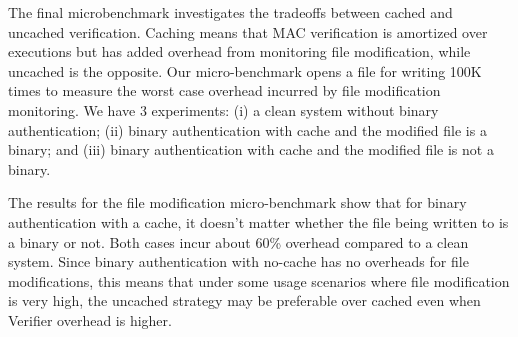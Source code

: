 The final microbenchmark investigates the tradeoffs between cached
and uncached verification.
Caching means that MAC verification is amortized over executions
but has added overhead from monitoring file modification,
while uncached is the opposite.
Our micro-benchmark opens a file for writing 100K times to
measure the worst case overhead incurred by file modification monitoring.
We have 3 experiments:
(i) a clean system without binary authentication;
(ii) binary authentication with cache and the modified file is a binary;
and (iii) binary authentication with cache and the modified file
is not a binary.

The results for the file modification micro-benchmark
show that for binary authentication with a cache, it
doesn't matter whether the file being written to is a binary or not.
Both cases incur about 60\% overhead compared to a clean system.
Since binary authentication with no-cache has no overheads for file
modifications, this means that under some usage scenarios where file modification
is very high,
the uncached strategy may be preferable over cached even when Verifier overhead
is higher.

